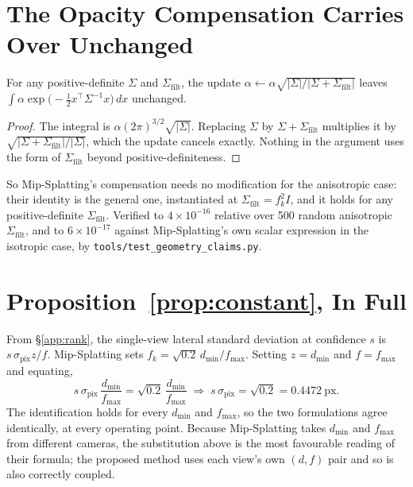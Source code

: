 \section{The Opacity Compensation Carries Over Unchanged}
\label{app:mass}
\begin{lemma}
\label{lem:mass}
For any positive-definite $\Sigma$ and $\Sigma_{\mathrm{filt}}$, the update
$\alpha \leftarrow \alpha\sqrt{|\Sigma| / |\Sigma + \Sigma_{\mathrm{filt}}|}$
leaves $\int \alpha \exp\!\big(-\tfrac12 x^{\!\top}\Sigma^{-1}x\big)\,dx$
unchanged.
\end{lemma}
\begin{proof}
The integral is $\alpha(2\pi)^{3/2}\sqrt{|\Sigma|}$. Replacing $\Sigma$ by
$\Sigma + \Sigma_{\mathrm{filt}}$ multiplies it by
$\sqrt{|\Sigma + \Sigma_{\mathrm{filt}}|/|\Sigma|}$, which the update cancels
exactly. Nothing in the argument uses the form of $\Sigma_{\mathrm{filt}}$
beyond positive-definiteness.
\end{proof}
So Mip-Splatting's compensation needs no modification for the anisotropic case:
their identity is the general one, instantiated at $\Sigma_{\mathrm{filt}} =
f_k^2 I$, and it holds for any positive-definite $\Sigma_{\mathrm{filt}}$. Verified to
$4\times10^{-16}$ relative over 500 random anisotropic $\Sigma_{\mathrm{filt}}$,
and to $6\times10^{-17}$ against Mip-Splatting's own scalar expression in the
isotropic case, by \texttt{tools/test\_geometry\_claims.py}.


\section{Proposition~\ref{prop:constant}, In Full}
\label{app:prop1}
From \S\ref{app:rank}, the single-view lateral standard deviation at confidence
$s$ is $s\,\sigma_{\mathrm{pix}}z/f$. Mip-Splatting sets
$f_k = \sqrt{0.2}\,d_{\min}/f_{\max}$. Setting $z = d_{\min}$ and $f = f_{\max}$
and equating,
\begin{equation}
  s\,\sigma_{\mathrm{pix}}\,\frac{d_{\min}}{f_{\max}}
  = \sqrt{0.2}\,\frac{d_{\min}}{f_{\max}}
  \;\Longrightarrow\;
  s\,\sigma_{\mathrm{pix}} = \sqrt{0.2} = 0.4472\ \text{px}.
\end{equation}
The identification holds for every $d_{\min}$ and $f_{\max}$, so the two formulations agree identically, at every operating point. Because Mip-Splatting takes $d_{\min}$ and $f_{\max}$ from different cameras, the substitution above is the most favourable reading of their
formula; the proposed method uses each view's own $(d,f)$ pair and so is also
correctly coupled.


